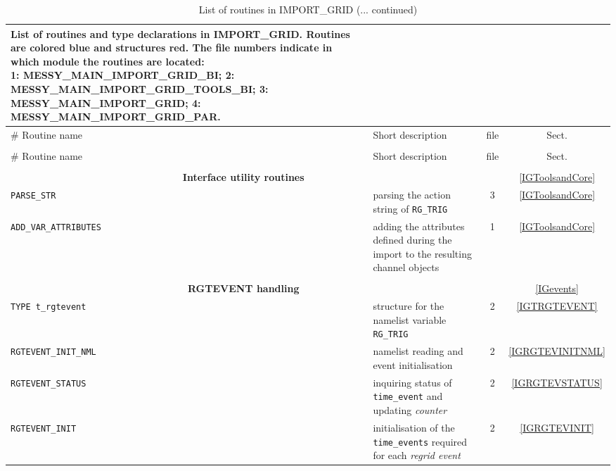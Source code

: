 \documentclass[11pt,twoside]{report}
\begin{document}
\begin{longtable}{|p{5cm}p{8.5cm}cc|}
\caption{List of routines and type declarations in
IMPORT\_GRID. Routines are colored blue and structures
red. The file numbers indicate in which module the routines are
located:\\
1: MESSY\_MAIN\_IMPORT\_GRID\_BI; 2:
MESSY\_MAIN\_IMPORT\_GRID\_TOOLS\_BI; 3: MESSY\_MAIN\_IMPORT\_GRID; 
4: MESSY\_MAIN\_IMPORT\_GRID\_PAR.\label{Tab:routines}}\\
\hline
\# Routine name & Short description & file & Sect. \\
\hline
\endfirsthead
\caption{List of routines in IMPORT\_GRID (... continued)}\\
\hline
\# Routine name & Short description & file & Sect. \\
\hline
\endhead
\hline
\endfoot
 & & & \\ 
\multicolumn{2}{|c}{\bf \Large Interface utility routines} & & \ref{IGToolsandCore}\\ \hline%
{\color{blue} \tt PARSE\_STR} & parsing the action string of \verb|RG_TRIG|
 &  3 & \ref{IGToolsandCore}\\%
{\color{blue} \tt ADD\_VAR\_ATTRIBUTES} & adding the attributes defined
 during the import to the resulting channel objects
 &  1& \ref{IGToolsandCore}\\%
\hline& & & \\
\multicolumn{2}{|c}{\bf \Large RGTEVENT handling} & & \ref{IGevents}\\ \hline
{\color{red} \tt TYPE t\_rgtevent} & structure for the namelist
 variable {\tt RG\_TRIG} & 2 & \ref{IGTRGTEVENT} \\\hline
{\color{blue} \tt RGTEVENT\_INIT\_NML} & namelist reading and event
 initialisation &  2& \ref{IGRGTEVINITNML} \\ \hline
{\color{blue} \tt RGTEVENT\_STATUS} & inquiring status of {\tt
 time\_event} and updating {\it counter} &  2 & \ref{IGRGTEVSTATUS} \\\hline
{\color{blue} \tt RGTEVENT\_INIT} & initialisation of the {\tt time\_events} required for each {\it regrid event} &  2& \ref{IGRGTEVINIT} \\\hline

\end{longtable}
\end{document}
